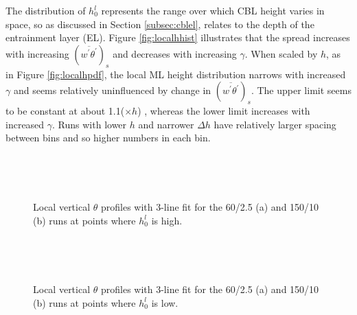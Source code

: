 The distribution of $h_{0}^{l}$ represents the range over which \acs{CBL} height varies in space, so as 
discussed in Section \ref{subsec:cblel}, relates to the depth of the entrainment layer (\acs{EL}).
Figure \ref{fig:localhhist} illustrates that the spread increases with increasing $(\overline{w^{'}\theta^{'}})_{s}$ and decreases with increasing $\gamma$.  When scaled by $h$, as in Figure \ref{fig:localhpdf}, the local \acs{ML} height distribution 
narrows with increased $\gamma$ and seems relatively uninfluenced by change in $(\overline{w^{'}\theta^{'}})_{s}$.  
The upper limit seems to be constant at about 1.1($\times h$) , whereas the lower limit increases 
with increased $\gamma$.   Runs with lower $h$ and narrower $\Delta h$ have relatively 
larger spacing between bins and so higher numbers in each bin.\\

\begin{figure}[htbp]
\begin{minipage}[b]{0.5\linewidth}
        \\
        \end{minipage}             
\quad
\begin{minipage}[b]{0.5\linewidth}
        \\
       
       \end{minipage}
        \caption[High local \acs{ML}]{Local vertical $\theta$ profiles with 3-line fit for the 60/2.5 (a) and 150/10 (b) runs at 
points where $h^{l}_{0}$ is high.}
        \label{fig:rssfitshigh}
\end{figure}

\begin{figure}[htbp]
\begin{minipage}[b]{0.5\linewidth}
        \\
        \end{minipage}             
\quad
\begin{minipage}[b]{0.5\linewidth}
        \\
       
       \end{minipage}
        \caption[Low local \acs{ML}]{Local vertical $\theta$ profiles with 3-line fit for the 60/2.5 (a) and 150/10 (b) runs at 
points where $h^{l}_{0}$ is low.}
        \label{fig:rssfitslow}
\end{figure}

